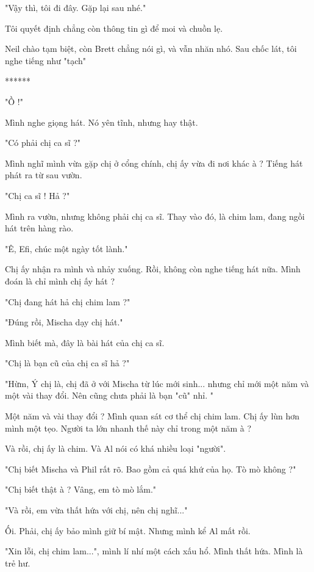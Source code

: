 "Vậy thì, tôi đi đây. Gặp lại sau nhé."

Tôi quyết định chẳng còn thông tin gì để moi và chuồn lẹ.

Neil chào tạm biệt, còn Brett chẳng nói gì, và vẫn nhăn nhó. Sau chốc lát, tôi nghe tiếng như "tạch" \\

\begin{center}
	******
\end{center}


 
 "Ồ !"
 
 Mình nghe giọng hát. Nó yên tĩnh, nhưng hay thật.
 
 "Có phải chị ca sĩ ?"
 
 Mình nghĩ mình vừa gặp chị ở cổng chính, chị ấy vừa đi nơi khác à ? Tiếng hát phát ra từ sau vườn.
 
 "Chị ca sĩ ! Hả ?"
 
 Mình ra vườn, nhưng không phải chị ca sĩ. Thay vào đó, là chim lam, đang ngồi hát trên hàng rào. 
 
 "Ê, Efi, chúc một ngày tốt lành."
 
 Chị ấy nhận ra mình và nhảy xuống. Rồi, không còn nghe tiếng hát nữa. Mình đoán là chỉ mình chị ấy hát ?
 
 "Chị đang hát hả chị chim lam ?"
 
 "Đúng rồi, Mischa dạy chị hát."
 
 Mình biết mà, đây là bài hát của chị ca sĩ.
 
 "Chị là bạn cũ của chị ca sĩ hả ?"
 
 "Hừm, Ý chị là, chị đã ở với Mischa từ lúc mới sinh... nhưng chỉ mới một năm và một vài thay đổi. Nên cũng chưa phải là bạn "cũ" nhỉ. "
 
 Một năm và vài thay đổi ? Mình quan sát cơ thể chị chim lam. Chị ấy lùn hơn mình một tẹo. Người ta lớn nhanh thế này chỉ trong một năm à ?
 
 Và rồi, chị ấy là chim. Và Al nói có khá nhiều loại "người".
 
 "Chị biết Mischa và Phil rất rõ. Bao gồm cả quá khứ của họ. Tò mò không ?"
 
 "Chị biết thật à ? Vâng, em tò mò lắm."
 
 "Và rồi, em vừa thất hứa với chị, nên chị nghĩ..."
 
 Ối. Phải, chị ấy bảo mình giữ bí mật. Nhưng mình kể Al mất rồi.
 
 "Xin lỗi, chị chim lam...", mình lí nhí một cách xấu hổ. Mình thất hứa. Mình là trẻ hư.
 
